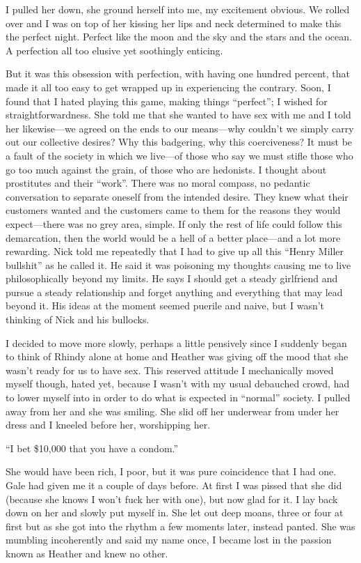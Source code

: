 I pulled her down, she ground herself into me, my excitement obvious. We
rolled over and I was on top of her kissing her lips and neck determined
to make this the perfect night. Perfect like the moon and the sky and
the stars and the ocean. A perfection all too elusive yet soothingly
enticing.

But it was this obsession with perfection, with having one hundred
percent, that made it all too easy to get wrapped up in experiencing the
contrary. Soon, I found that I hated playing this game, making things
``perfect''; I wished for straightforwardness. She told me that she
wanted to have sex with me and I told her likewise---we agreed on the
ends to our means---why couldn't we simply carry out our collective
desires? Why this badgering, why this coerciveness? It must be a fault
of the society in which we live---of those who say we must stifle those
who go too much against the grain, of those who are hedonists. I thought
about prostitutes and their ``work''. There was no moral compass, no
pedantic conversation to separate oneself from the intended desire. They
knew what their customers wanted and the customers came to them for the
reasons they would expect---there was no grey area, simple. If only the
rest of life could follow this demarcation, then the world would be a
hell of a better place---and a lot more rewarding. Nick told me
repeatedly that I had to give up all this ``Henry Miller bullshit'' as
he called it. He said it was poisoning my thoughts causing me to live
philosophically beyond my limits. He says I should get a steady
girlfriend and pursue a steady relationship and forget anything and
everything that may lead beyond it. His ideas at the moment seemed
puerile and naive, but I wasn't thinking of Nick and his bullocks.

I decided to move more slowly, perhaps a little pensively since I
suddenly began to think of Rhindy alone at home and Heather was giving
off the mood that she wasn't ready for us to have sex. This reserved
attitude I mechanically moved myself though, hated yet, because I wasn't
with my usual debauched crowd, had to lower myself into in order to do
what is expected in ``normal'' society. I pulled away from her and she
was smiling. She slid off her underwear from under her dress and I
kneeled before her, worshipping her.

``I bet \$10,000 that you have a condom.''

She would have been rich, I poor, but it was pure coincidence that I had
one. Gale had given me it a couple of days before. At first I was pissed
that she did (because she knows I won't fuck her with one), but now glad
for it. I lay back down on her and slowly put myself in. She let out
deep moans, three or four at first but as she got into the rhythm a few
moments later, instead panted. She was mumbling incoherently and said my
name once, I became lost in the passion known as Heather and knew no
other.

